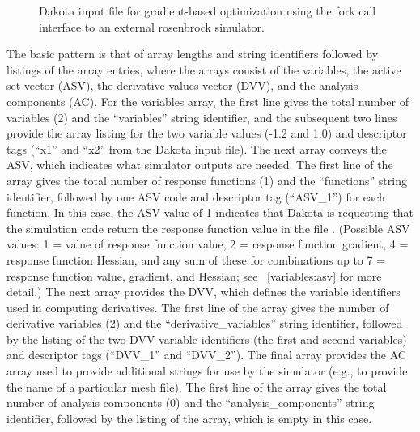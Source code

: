 \begin{figure}[b!]
  \begin{bigbox}
    \begin{small}
    \end{small}
  \end{bigbox}
  \caption{Dakota input file for gradient-based optimization using the
    fork call interface to an external rosenbrock simulator.}
  \label{tutorial:rosenbrock_user}
\end{figure}

The basic pattern is that of array lengths and string identifiers
followed by listings of the array entries, where the arrays consist of
the variables, the active set vector (ASV), the derivative values
vector (DVV), and the analysis components (AC). For the variables
array, the first line gives the total number of variables (2) and the
``variables'' string identifier, and the subsequent two lines provide
the array listing for the two variable values (-1.2 and 1.0) and
descriptor tags (``x1'' and ``x2'' from the Dakota input file). The
next array conveys the ASV, which indicates what
simulator outputs are needed. The first line of the array gives the total number
of response functions (1) and the ``functions'' string identifier,
followed by one ASV code and descriptor tag
(``ASV\_1'') for each function. In this case, the ASV value of 1 indicates that Dakota
is requesting that the simulation code return the response function
value in the file . (Possible ASV values: 1 = value of
response function value, 2 = response function gradient, 4 = response
function Hessian, and any sum of these for combinations up to
7 = response function value, gradient, and Hessian; see ~\ref{variables:asv} for
more detail.)  The next array provides the DVV, which defines the
variable identifiers used in computing derivatives. The first line of
the array gives the number of derivative variables (2) and the
``derivative\_variables'' string identifier, followed by the listing of
the two DVV variable identifiers (the first and second variables) and
descriptor tags (``DVV\_1'' and ``DVV\_2''). The final array provides
the AC array used to provide additional strings for use by the
simulator (e.g., to provide the name of a particular mesh file). The
first line of the array gives the total number of analysis components
(0) and the ``analysis\_components'' string identifier, followed by the
listing of the array, which is empty in this case.

